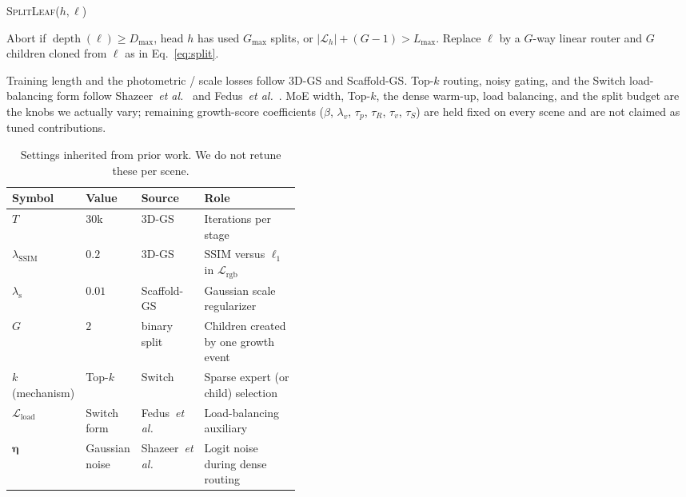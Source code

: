 \begin{algorithm}[t]
\caption{\textsc{SplitLeaf}($h,\ell$)}
\label{alg:grow}
\small
\begin{algorithmic}[1]
\State Abort if $\operatorname{depth}(\ell)\ge D_{\max}$, head $h$ has used $G_{\max}$ splits, or $|\mathcal{L}_{h}|+(G-1)>L_{\max}$.
\State Replace $\ell$ by a $G$-way linear router and $G$ children cloned from $\ell$ as in Eq.~\eqref{eq:split}.
\end{algorithmic}
\end{algorithm}

Training length and the photometric / scale losses follow 3D-GS and Scaffold-GS.
Top-$k$ routing, noisy gating, and the Switch load-balancing form follow
Shazeer~\textit{et al.}~\cite{shazeer2017moe} and Fedus~\textit{et al.}~\cite{fedus2022switch}.
MoE width, Top-$k$, the dense warm-up, load balancing, and the split budget
are the knobs we actually vary; remaining growth-score coefficients
($\beta$, $\lambda_{v}$, $\tau_{p}$, $\tau_{R}$, $\tau_{v}$, $\tau_{S}$)
are held fixed on every scene and are not claimed as tuned contributions.

\begin{table}[t]
\centering
\caption{Settings inherited from prior work. We do not retune these per scene.}
\label{tab:hparams-inherited}
\setlength{\tabcolsep}{4pt}
\small
\begin{tabular}{lllp{0.42\linewidth}}
\toprule
Symbol & Value & Source & Role \\
\midrule
$T$ & $30\mathrm{k}$ & 3D-GS~\cite{kerbl20233d} & Iterations per stage \\
$\lambda_{\mathrm{SSIM}}$ & $0.2$ & 3D-GS~\cite{kerbl20233d} & SSIM versus $\ell_1$ in $\mathcal{L}_{\mathrm{rgb}}$ \\
$\lambda_{\mathrm{s}}$ & $0.01$ & Scaffold-GS~\cite{lu2024scaffold} & Gaussian scale regularizer \\
$G$ & $2$ & binary split & Children created by one growth event \\
$k$ (mechanism) & Top-$k$ & Switch~\cite{shazeer2017moe,fedus2022switch} & Sparse expert (or child) selection \\
$\mathcal{L}_{\mathrm{load}}$ & Switch form & Fedus~\textit{et al.}~\cite{fedus2022switch} & Load-balancing auxiliary \\
$\boldsymbol{\eta}$ & Gaussian noise & Shazeer~\textit{et al.}~\cite{shazeer2017moe} & Logit noise during dense routing \\
\bottomrule
\end{tabular}
\end{table}

